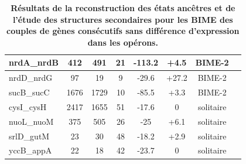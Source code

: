 \documentclass[12pt,a4paper]{report}
\begin{document}
\begin{table}[h!]
{\begin{tabular}{|l|c|c|c|c|c|c|c|}
  \hline
  nrdA\_nrdB & 412 & 491 & 21 & -113.2 & +4.5 & BIME-2\\
  \hline
  nrdD\_nrdG & 97 & 19 & 9 & -29.6 & +27.2 & BIME-2\\
  \hline  
  sucB\_sucC & 1676 & 1729 & 10 & -85.5 & +3.3 & BIME-2\\
  \hline
  cysI\_cysH & 2417 & 1655 & 51 & -17.6 & 0 & solitaire\\
  \hline  
  nuoL\_nuoM & 375 & 505 & 26 & -25 & +6.1 & solitaire\\
  \hline
  srlD\_gutM & 23 & 30 & 48 & -18.2 & +2.9 & solitaire\\
  \hline
  yccB\_appA & 22 & 18 & 42 & -23.7 & 0 & solitaire\\
  \hline
\end{tabular}
}
\caption{\textbf{Résultats de la reconstruction des états ancêtres et de l'étude des structures secondaires pour les BIME des couples de gènes consécutifs sans différence d'expression dans les opérons.} }
\end{table}
\end{document}

